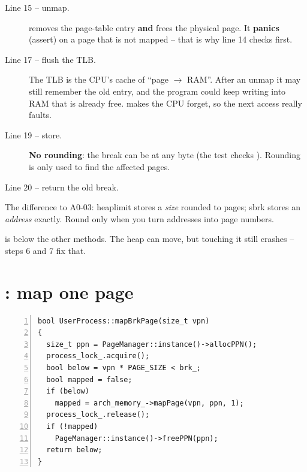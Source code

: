 \documentclass[11pt]{report}
\newcommand{\done}[1]{\begin{keybox}[title={Done when}]#1\end{keybox}}
\begin{document}
\begin{description}
  \item[Line 15 -- unmap.]  removes the page-table entry \textbf{and} frees the physical
        page. It \textbf{panics} (assert) on a page that is not mapped -- that is why line 14 checks first.
  \item[Line 17 -- flush the TLB.] The TLB is the CPU's cache of ``page $\to$ RAM''. After an unmap it may
        still remember the old entry, and the program could keep writing into RAM that is already free.
         makes the CPU forget, so the next access really faults.
  \item[Line 19 -- store.] \textbf{No rounding}: the break can be at any byte (the test checks
        ). Rounding is only used to find the affected pages.
  \item[Line 20 -- return the old break.]
\end{description}

\begin{trapbox}
The difference to A0-03: heaplimit stores a \emph{size} rounded to pages; sbrk stores an \emph{address}
exactly. Round only when you turn addresses into page numbers.
\end{trapbox}

\done{ is below the other  methods. The heap can move, but touching it
still crashes -- steps 6 and 7 fix that.}

\section{: map one page \hfill {\normalsize{}}}

\begin{lstlisting}[style=cpp,numbers=left,numberstyle=\tiny\color{headgray}]
bool UserProcess::mapBrkPage(size_t vpn)
{
  size_t ppn = PageManager::instance()->allocPPN();
  process_lock_.acquire();
  bool below = vpn * PAGE_SIZE < brk_;
  bool mapped = false;
  if (below)
    mapped = arch_memory_->mapPage(vpn, ppn, 1);
  process_lock_.release();
  if (!mapped)
    PageManager::instance()->freePPN(ppn);
  return below;
}
\end{lstlisting}
\end{document}

